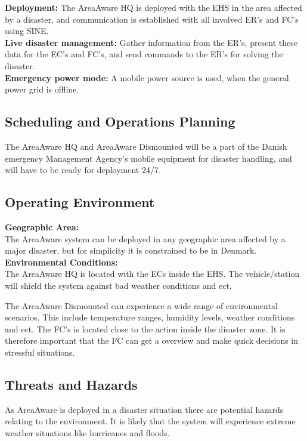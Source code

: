 \noindent \textbf{Deployment:} The AreaAware HQ is deployed with the EHS in the area affected by a disaster, and communication is established with all involved ER's and FC's using SINE.\\
 
\noindent \textbf{Live disaster management:} Gather information from the ER's, present these data for the EC's and FC's, and send commands to the ER's for solving the disaster.\\

\noindent \textbf{Emergency power mode:} A mobile power source is used, when the general power grid is offline.

\subsection{Scheduling and Operations Planning}
The AreaAware HQ and AreaAware Dismounted will be a part of the Danish emergency Management Agency’s mobile equipment for disaster handling, and will have to be ready for deployment 24/7.

\subsection{Operating Environment}
\noindent \textbf{Geographic Area:}\\
The AreaAware system can be deployed in any geographic area affected by a major disaster, but for simplicity it is constrained to be in Denmark. \\

\noindent \textbf{Environmental Conditions:}\\
The AreaAware HQ is located with the ECs inside the EHS. The vehicle/station will shield the system against bad weather conditions and ect.

The AreaAware Dismounted can experience a wide range of environmental scenarios. This include temperature ranges, humidity levels, weather conditions and ect. The FC's is located close to the action inside the disaster zone. It is therefore important that the FC can get a overview and make quick decisions in stressful situations.

\subsection{Threats and Hazards}
As AreaAware is deployed in a disaster situation there are potential hazards relating to the environment. It is likely that the system will experience extreme weather situations like hurricanes and floods.

